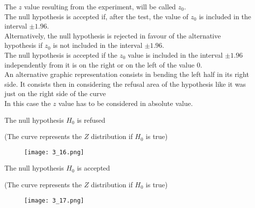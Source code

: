 \begin{frame}
  \vspace*{.25cm}
  The  $ z $ value resulting from the experiment, will be called $ z_0 $.\\
  \vspace*{.25cm}
  The null hypothesis is accepted if, after the test, the value of $ z_0 $ is included in the interval $ \pm 1.96 $.\\
  \vspace*{.25cm}
  Alternatively, the null hypothesis is rejected in favour of the alternative hypothesis if $ z_0 $ is not included in the interval $ \pm 1.96 $.\\
  \vspace*{.25cm}
  The null hypothesis is accepted if the $ z_0 $ value is included in the interval $\pm1.96$ independently from it is on the right or on the left of the value 0.\\
  \vspace*{.25cm}
  An alternative graphic representation consists in bending the left half in its right side. It consists then in considering the refusal area of the hypothesis like it was just on the right side of the curve \\
  In this case the $ z $ value has to be considered in absolute value.
\end{frame}

\begin{frame}
  \vspace*{.25cm}
  \centering
  The null hypothesis $ H_0 $ is refused\\
  \begin{tiny} (The curve represents the $ Z $ distribution if $ H_0 $ is true) \end{tiny}
  \begin{figure}
    \texttt{[image: 3\_16.png]}
  \end{figure}
\end{frame}

\begin{frame}
  \vspace*{.25cm}
  \centering
  The null hypothesis $ H_0 $ is accepted\\
  \begin{tiny} (The curve represents the $ Z $ distribution if $ H_0 $ is true) \end{tiny}
  \begin{figure}
    \texttt{[image: 3\_17.png]}
  \end{figure}
\end{frame}

